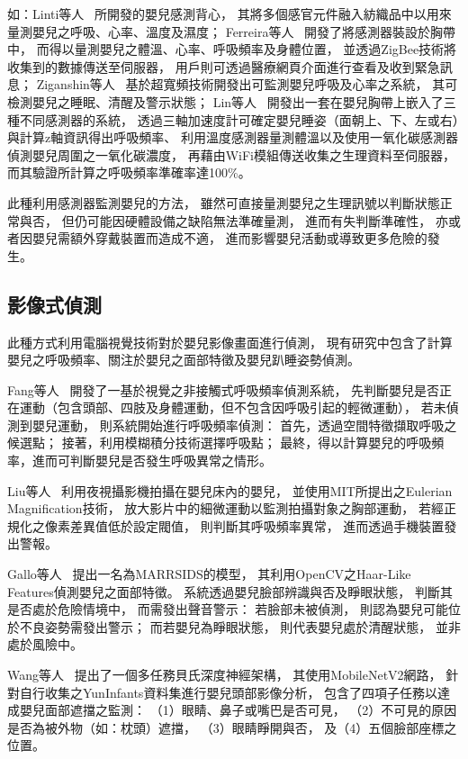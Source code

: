\documentclass[class=NCU_thesis, crop=false]{standalone}
\begin{document}
如：Linti等人~\cite{linti_sensory_2006}
所開發的嬰兒感測背心，
其將多個感官元件融入紡織品中以用來量測嬰兒之呼吸、心率、溫度及濕度；
Ferreira等人~\cite{ferreira_smart_2016}
開發了將感測器裝設於胸帶中，
而得以量測嬰兒之體溫、心率、呼吸頻率及身體位置，
並透過ZigBee技術將收集到的數據傳送至伺服器，
用戶則可透過醫療網頁介面進行查看及收到緊急訊息；
Ziganshin等人~\cite{ziganshin_uwb_2010}
基於超寬頻技術開發出可監測嬰兒呼吸及心率之系統，
其可檢測嬰兒之睡眠、清醒及警示狀態；
Lin等人~\cite{lin_wireless_2014}
開發出一套在嬰兒胸帶上嵌入了三種不同感測器的系統，
透過三軸加速度計可確定嬰兒睡姿（面朝上、下、左或右）與計算z軸資訊得出呼吸頻率、
利用溫度感測器量測體溫以及使用一氧化碳感測器偵測嬰兒周圍之一氧化碳濃度，
再藉由WiFi模組傳送收集之生理資料至伺服器，
而其驗證所計算之呼吸頻率準確率達100\%。

此種利用感測器監測嬰兒的方法，
雖然可直接量測嬰兒之生理訊號以判斷狀態正常與否，
但仍可能因硬體設備之缺陷無法準確量測，
進而有失判斷準確性，
亦或者因嬰兒需額外穿戴裝置而造成不適，
進而影響嬰兒活動或導致更多危險的發生。

\subsection{影像式偵測}
此種方式利用電腦視覺技術對於嬰兒影像畫面進行偵測，
現有研究中包含了計算嬰兒之呼吸頻率、關注於嬰兒之面部特徵及嬰兒趴睡姿勢偵測。

Fang等人~\cite{fang_vision-based_2015}
開發了一基於視覺之非接觸式呼吸頻率偵測系統，
先判斷嬰兒是否正在運動（包含頭部、四肢及身體運動，但不包含因呼吸引起的輕微運動），
若未偵測到嬰兒運動，
則系統開始進行呼吸頻率偵測：
首先，透過空間特徵擷取呼吸之候選點；
接著，利用模糊積分技術選擇呼吸點；
最終，得以計算嬰兒的呼吸頻率，進而可判斷嬰兒是否發生呼吸異常之情形。

Liu等人~\cite{liu_video-based_2017}
利用夜視攝影機拍攝在嬰兒床內的嬰兒，
並使用MIT所提出之Eulerian Magnification技術，
放大影片中的細微運動以監測拍攝對象之胸部運動，
若經正規化之像素差異值低於設定閥值，
則判斷其呼吸頻率異常，
進而透過手機裝置發出警報。

Gallo等人~\cite{gallo_marrsids_2019}
提出一名為MARRSIDS的模型，
其利用OpenCV之Haar-Like Features偵測嬰兒之面部特徵。
系統透過嬰兒臉部辨識與否及睜眼狀態，
判斷其是否處於危險情境中，
而需發出聲音警示：
若臉部未被偵測，
則認為嬰兒可能位於不良姿勢需發出警示；
而若嬰兒為睜眼狀態，
則代表嬰兒處於清醒狀態，
並非處於風險中。

Wang等人~\cite{wang_multi-task_2019}
提出了一個多任務貝氏深度神經架構，
其使用MobileNetV2網路，
針對自行收集之YunInfants資料集進行嬰兒頭部影像分析，
包含了四項子任務以達成嬰兒面部遮擋之監測：
（1）眼睛、鼻子或嘴巴是否可見，
（2）不可見的原因是否為被外物（如：枕頭）遮擋，
（3）眼睛睜開與否，
及（4）五個臉部座標之位置。
\end{document}
